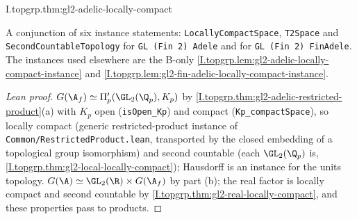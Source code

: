 \begin{theorem}
\end{theorem}
\begin{tfformal}{I.topgrp.thm:gl2-adelic-locally-compact}
\begin{tffidelity}
A conjunction of six instance statements: \texttt{LocallyCompactSpace}, \texttt{T2Space} and \texttt{SecondCountableTopology} for \texttt{GL (Fin 2) Adele} and for \texttt{GL (Fin 2) FinAdele}. The instances used elsewhere are the B-only \cref{I.topgrp.lem:gl2-adelic-locally-compact-instance} and \cref{I.topgrp.lem:gl2-fin-adelic-locally-compact-instance}.
\end{tffidelity}
\end{tfformal}
\begin{proof}[Lean proof]
$G(\A_f)\simeq\Pi'_p(\GL_2(\Q_p),K_p)$ by \cref{I.topgrp.thm:gl2-adelic-restricted-product}(a) with $K_p$ open (\texttt{isOpen\_Kp}) and compact (\texttt{Kp\_compactSpace}), so locally compact (generic restricted-product instance of \texttt{Common/RestrictedProduct.lean}, transported by the closed embedding of a topological group isomorphism) and second countable (each $\GL_2(\Q_p)$ is, \cref{I.topgrp.thm:gl2-local-locally-compact}); Hausdorff is an instance for the units topology. $G(\A)\simeq\GL_2(\R)\times G(\A_f)$ by part (b); the real factor is locally compact and second countable by \cref{I.topgrp.thm:gl2-real-locally-compact}, and these properties pass to products.
\end{proof}

